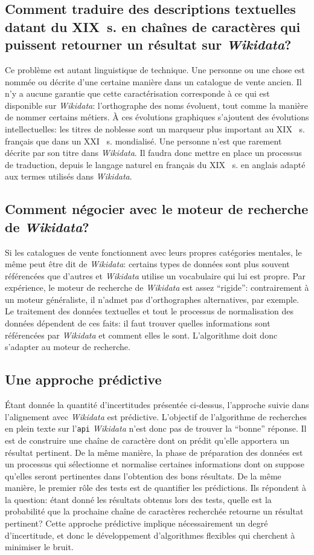 \documentclass[a4paper, 12pt, twoside]{book}
\newcommand{\scl}[1]{%
	#1%
	\ifthenelse{\equal{#1}{I}}{\up{er}}{\up{ème}}%
	~s.%
}
\newcommand{\api}{\texttt{\gls{api}}}
\newcommand{\wkd}{\textit{Wikidata}}
\begin{document}
\subsection{Comment traduire des descriptions textuelles datant du XIX~s. en chaînes de caractères qui puissent retourner un résultat sur \wkd{}?} 
Ce problème est autant linguistique de technique. Une personne ou une chose est nommée ou décrite d'une certaine manière dans un catalogue de vente ancien. Il n'y a aucune garantie que cette caractérisation corresponde à ce qui est disponible sur \wkd{}: l'orthographe des noms évoluent, tout comme la manière de nommer certains métiers. À ces évolutions graphiques s'ajoutent des évolutions intellectuelles: les titres de noblesse sont un marqueur plus important au \scl{XIX} français que dans un \scl{XXI} mondialisé. Une personne n'est que rarement décrite par son titre dans \wkd{}. Il faudra donc mettre en place un processus de traduction, depuis le langage naturel en français du \scl{XIX} en anglais adapté aux termes utilisés dans \wkd{}.

\subsection{Comment négocier avec le moteur de recherche de \wkd{}?} 
Si les catalogues de vente fonctionnent avec leurs propres catégories mentales, le même peut être dit de \wkd{}: certains types de données sont plus souvent référencées que d'autres et \wkd{} utilise un vocabulaire qui lui est propre. Par expérience, le moteur de recherche de \wkd{} est assez \enquote{rigide}: contrairement à un moteur généraliste, il n'admet pas d'orthographes alternatives, par exemple. Le traitement des données textuelles et tout le processus de normalisation des données dépendent de ces faits: il faut trouver quelles informations sont référencées par \wkd{} et comment elles le sont. L'algorithme doit donc s'adapter au moteur de recherche. 

\subsection{Une approche prédictive}
Étant donnée la quantité d'incertitudes présentée ci-dessus, l'approche suivie dans l'alignement avec \wkd{} est prédictive. L'objectif de l'algorithme de recherches en plein texte sur l'\api{} \wkd{} n'est donc pas de trouver la \enquote{bonne} réponse. Il est de construire une chaîne de caractère dont on prédit qu'elle apportera un résultat pertinent. De la même manière, la phase de préparation des données est un processus qui sélectionne et normalise certaines informations dont on suppose qu'elles seront pertinentes dans l'obtention des bons résultats. De la même manière, le premier rôle des tests est de quantifier les prédictions. Ils répondent à la question: étant donné les résultats obtenus lors des tests, quelle est la probabilité que la prochaine chaîne de caractères recherchée retourne un résultat pertinent? Cette approche prédictive implique nécessairement un degré d'incertitude, et donc le développement d'algorithmes flexibles qui cherchent à minimiser le bruit. 
\end{document}
